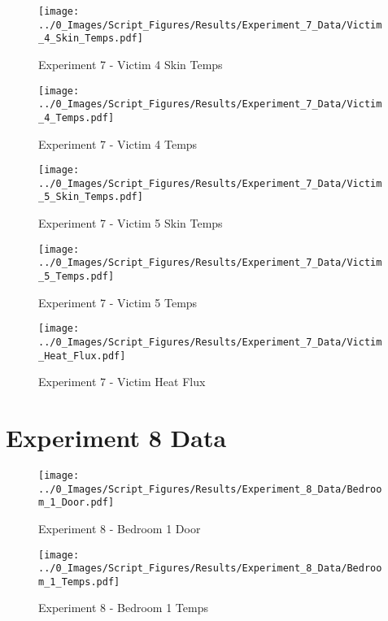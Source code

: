 	\clearpage

	\begin{figure}[H]
		\centering
		\texttt{[image: ../0\_Images/Script\_Figures/Results/Experiment\_7\_Data/Victim\_4\_Skin\_Temps.pdf]}
		\caption[]{Experiment 7 - Victim 4 Skin Temps}
	\end{figure}
 

	\begin{figure}[H]
		\centering
		\texttt{[image: ../0\_Images/Script\_Figures/Results/Experiment\_7\_Data/Victim\_4\_Temps.pdf]}
		\caption[]{Experiment 7 - Victim 4 Temps}
	\end{figure}
 
	\clearpage

	\begin{figure}[H]
		\centering
		\texttt{[image: ../0\_Images/Script\_Figures/Results/Experiment\_7\_Data/Victim\_5\_Skin\_Temps.pdf]}
		\caption[]{Experiment 7 - Victim 5 Skin Temps}
	\end{figure}
 

	\begin{figure}[H]
		\centering
		\texttt{[image: ../0\_Images/Script\_Figures/Results/Experiment\_7\_Data/Victim\_5\_Temps.pdf]}
		\caption[]{Experiment 7 - Victim 5 Temps}
	\end{figure}
 
	\clearpage

	\begin{figure}[H]
		\centering
		\texttt{[image: ../0\_Images/Script\_Figures/Results/Experiment\_7\_Data/Victim\_Heat\_Flux.pdf]}
		\caption[]{Experiment 7 - Victim Heat Flux}
	\end{figure}
 

\clearpage		\large
\section{Experiment 8 Data} \label{App:Exp8Results} 

	\begin{figure}[H]
		\centering
		\texttt{[image: ../0\_Images/Script\_Figures/Results/Experiment\_8\_Data/Bedroom\_1\_Door.pdf]}
		\caption[]{Experiment 8 - Bedroom 1 Door}
	\end{figure}
 

	\begin{figure}[H]
		\centering
		\texttt{[image: ../0\_Images/Script\_Figures/Results/Experiment\_8\_Data/Bedroom\_1\_Temps.pdf]}
		\caption[]{Experiment 8 - Bedroom 1 Temps}
	\end{figure}
 
